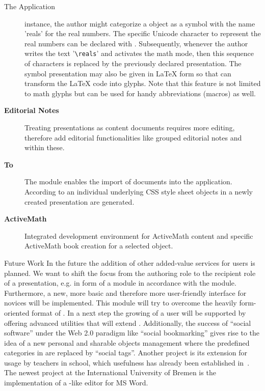 \begin{omgroup}[id=cpoint,short=CPoint,creators=ako]
\begin{omgroup}[id=cpoint.app]{The {\cpoint} Application}
\begin{description}
  instance, the author might categorize a {\ppt} object as a symbol with the name 'reals'
  for the real numbers. The specific Unicode character to represent the real numbers can
  be declared with {\cpoint}. Subsequently, whenever the author writes the text
  '\verb|\reals|' and activates the math mode, then this sequence of characters is
  replaced by the previously declared presentation. The symbol presentation may also be
  given in {\LaTeX} form so that {\texpoint} can transform the {\LaTeX} code into {\ppt}
  glyphs. Note that this feature is not limited to math glyphs but can be used for handy
  abbreviations (macros) as well.
\item[{\bf Editorial Notes}\twin{editorial}{note}] Treating {\ppt} presentations as
  content documents requires more editing, therefore {\cpnotes} add editorial
  functionalities like grouped editorial notes and {} within these.
\item[{\bf {\omdoc} To {\ppt}}] The {\cpimport} module enables the import of {\omdoc}
  documents into the {\ppt} application. According to an individual underlying CSS style sheet {\ppt}
  objects in a newly created {\ppt} presentation are generated.
\item[{\bf ActiveMath}] Integrated development environment for ActiveMath content and
  specific ActiveMath book creation for a selected {\ppt} object.
\end{description}
\end{omgroup}

\begin{omgroup}{Future Work}
In the future the addition of other added-value services for users is planned. We want to
shift the focus from the authoring role to the recipient role of a {\ppt} presentation,
e.g. in form of a {\cpstudent} module in accordance with the {\cpauthor} module.
Furthermore, a new, more basic and therefore more user-friendly interface for {\cpoint}
novices will be implemented. This {\cpbasic} module will try to overcome the heavily
form-oriented format of {\cpoint}. In a next step the growing of a {\cpoint} user will be
supported by offering advanced {\cpoint} utilities that will extend {\cpbasic}.
Additionally, the success of ``social software'' under the Web 2.0 paradigm like ``social
bookmarking'' gives rise to the idea of a new personal and sharable {\ppt} objects
management where the predefined categories in {\cpoint} are replaced by ``social tags''.
Another {\cpoint} project is its extension for usage by teachers in school, which
usefulness has already been established in~\cite{Kohlhase:emPowerPoint}. The newest
project at the International University of Bremen is the implementation of a
{\cpoint}-like editor for MS Word.
\end{omgroup}
\end{omgroup}

